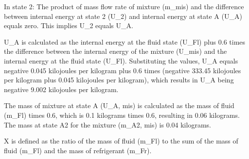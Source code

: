 In state 2:
The product of mass flow rate of mixture (m_mis) and the difference between internal energy at state 2 (U_2) and internal energy at state A (U_A) equals zero.
This implies U_2 equals U_A.

U_A is calculated as the internal energy at the fluid state (U_Fl) plus 0.6 times the difference between the internal energy of the mixture (U_mis) and the internal energy at the fluid state (U_Fl).
Substituting the values, U_A equals negative 0.045 kilojoules per kilogram plus 0.6 times (negative 333.45 kilojoules per kilogram plus 0.045 kilojoules per kilogram), which results in U_A being negative 9.002 kilojoules per kilogram.

The mass of mixture at state A (U_A, mis) is calculated as the mass of fluid (m_Fl) times 0.6, which is 0.1 kilograms times 0.6, resulting in 0.06 kilograms.
The mass at state A2 for the mixture (m_A2, mis) is 0.04 kilograms.

X is defined as the ratio of the mass of fluid (m_Fl) to the sum of the mass of fluid (m_Fl) and the mass of refrigerant (m_Fr).